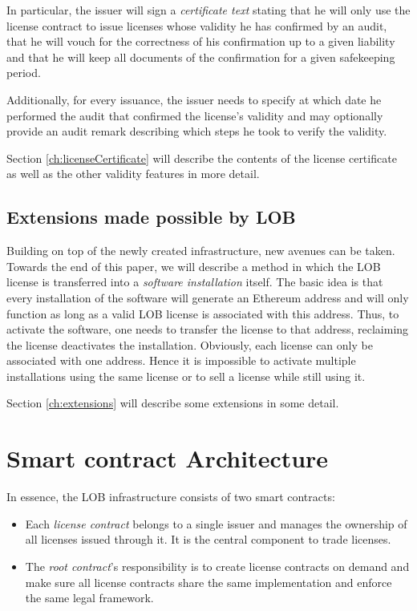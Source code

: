 \documentclass[a4paper]{article}
\begin{document}
In particular, the issuer will sign a \emph{certificate text} stating that he will only use the license contract to issue licenses whose validity he has confirmed by an audit, that he will vouch for the correctness of his confirmation up to a given liability and that he will keep all documents of the confirmation for a given safekeeping period.

Additionally, for every issuance, the issuer needs to specify at which date he performed the audit that confirmed the license's validity and may optionally provide an audit remark describing which steps he took to verify the validity.

Section \ref{ch:licenseCertificate} will describe the contents of the license certificate as well as the other validity features in more detail.





\subsection{Extensions made possible by LOB}
\label{ch:extensionsOverview}

Building on top of the newly created infrastructure, new avenues can be taken. Towards the end of this paper, we will describe a method in which the LOB license is transferred into a \emph{software installation} itself. The basic idea is that every installation of the software will generate an Ethereum address and will only function as long as a valid LOB license is associated with this address. Thus, to activate the software, one needs to transfer the license to that address, reclaiming the license deactivates the installation. Obviously, each license can only be associated with one address. Hence it is impossible to activate multiple installations using the same license or to sell a license while still using it.

Section \ref{ch:extensions} will describe some extensions in some detail.



\section{Smart contract Architecture}
\label{ch:smartContractArchitecture}

In essence, the LOB infrastructure consists of two smart contracts: 
\begin{itemize}
  \item Each \emph{license contract} belongs to a single issuer and manages the ownership of all licenses issued through it. It is the central component to trade licenses.
  \item The \emph{root contract}'s responsibility is to create license contracts on demand and make sure all license contracts share the same implementation and enforce the same legal framework.
\end{itemize}
\end{document}
